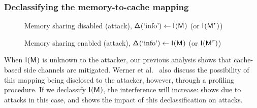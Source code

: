 \subsubsection{Declassifying the memory-to-cache mapping}
\begin{figure}
\begin{subfigure}[t]{0.495\linewidth}
\resizebox{\linewidth}{!}{\protect\small}
\caption{\scatterCache
\label{fig:scatter:jaccard:primeprobe:declass}}
\end{subfigure}%
\begin{subfigure}[t]{0.495\linewidth}
\resizebox{\linewidth}{!}{\protect\small}
\caption{\label{fig:phantom:jaccard:primeprobe:declass}}
\end{subfigure}%
\caption{Memory sharing disabled (\primeprobe attack),
  $\mathsf{\Delta}_{}(\text{`info'})\leftarrow\mathsf{I}_{}(\textsf{M}_{})$ (or
  $\mathsf{I}_{}(\textsf{M}^{\mathit{r}}_{})$)}
\label{fig:defenseprimeprobe:declass}
\end{figure}

\begin{figure}
\begin{subfigure}[t]{0.495\linewidth}
\resizebox{\linewidth}{!}{\protect\small}
\caption{\scatterCache\label{fig:scatter:jaccard:flushreload:declass}}
\end{subfigure}%
\centering
\begin{subfigure}[t]{0.495\linewidth}
\resizebox{\linewidth}{!}{\protect\small}
\caption{\label{fig:phantom:jaccard:flushreload:declass} }
\end{subfigure}%
\caption{Memory sharing enabled (\flushreload attack),
$\mathsf{\Delta}_{}(\text{`info'})\leftarrow\mathsf{I}_{}(\textsf{M}_{})$ (or $\mathsf{I}_{}(\textsf{M}^{\mathit{r}}_{})$) }
\end{figure}

When $\mathsf{I}_{}(\textsf{M}_{})$ is unknown to the attacker, our previous
analysis shows that cache-based side channels are mitigated.  Werner
et al.~\cite{scatterCache} also discuss the possibility of this mapping
being disclosed to the attacker, however, through a profiling procedure.
If we declassify $\mathsf{I}_{}(\textsf{M}_{})$, the interference
\JaccardWithDeclass{\secretsSetSize} will increase:
 shows
\JaccardWithDeclass{\secretsSetSize} due to \primeprobe attacks in
this case, and  shows
the impact of this declassification on \flushreload attacks.


